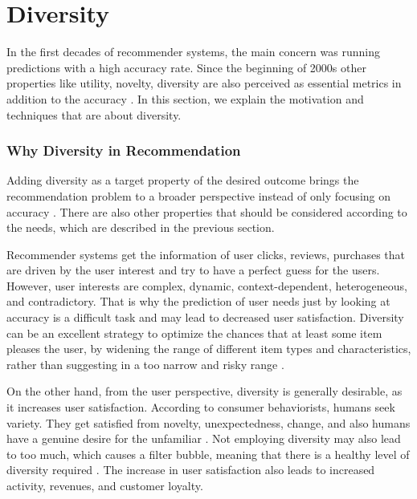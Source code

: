 
\section{Diversity}\label{section:novelty_and_diversity}

In the first decades of recommender systems, the main concern was running predictions with a high accuracy rate. Since the beginning of 2000s other properties like utility, novelty, diversity are also perceived as essential metrics in addition to the accuracy \cite{Hurley:2011:NDT:1944339.1944341}. In this section, we explain the motivation and techniques that are about diversity. 

\subsubsection{Why Diversity in Recommendation}

Adding diversity as a target property of the desired outcome brings the recommendation problem to a broader perspective instead of only focusing on accuracy \cite{McNee:2006:AEA:1125451.1125659}. There are also other properties that should be considered according to the needs, which are described in the previous section. 

Recommender systems get the information of user clicks, reviews, purchases that are driven by the user interest and try to have a perfect guess for the users. However, user interests are complex, dynamic, context-dependent, heterogeneous, and contradictory. That is why the prediction of user needs just by looking at accuracy is a difficult task and may lead to decreased user satisfaction. Diversity can be an excellent strategy to optimize the chances that at least some item pleases the user, by widening the range of different item types and characteristics, rather than suggesting in a too narrow and risky range \cite{castells2015novelty}.

On the other hand, from the user perspective, diversity is generally desirable, as it increases user satisfaction. According to consumer behaviorists, humans seek variety. They get satisfied from novelty, unexpectedness, change, and also humans have a genuine desire for the unfamiliar \cite{castells2015novelty}. Not employing diversity may also lead to too much, which causes a filter bubble, meaning that there is a healthy level of diversity required \cite{Nguyen:2014:EFB:2566486.2568012}. The increase in user satisfaction also leads to increased activity, revenues, and customer loyalty.

